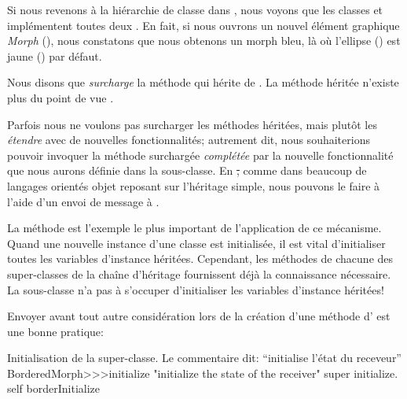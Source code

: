 \documentclass[a4paper,10pt,twoside]{book}
\begin{document}
Si nous revenons à la hiérarchie de classe  dans , nous voyons que les classes  et \mbox{} implémentent toutes deux .
En fait, si nous ouvrons un nouvel élément graphique \emph{Morph} (), nous constatons que nous obtenons un morph bleu, là où l'ellipse () est jaune \mbox{()} par défaut.

Nous disons que  \emph{surcharge} la méthode  qui hérite de .
La méthode héritée n'existe plus du point de vue .

Parfois nous ne voulons pas surcharger les méthodes héritées, mais plutôt les \emph{étendre} avec de nouvelles fonctionnalités; autrement dit, nous souhaiterions pouvoir invoquer la méthode surchargée \emph{complétée} par la nouvelle fonctionnalité que nous aurons définie dans la sous-classe.
En \st, comme dans beaucoup de langages orientés objet reposant sur l'héritage simple, nous pouvons le faire à l'aide d'un envoi de message à \super.

La méthode  est l'exemple le plus important de l'application de ce mécanisme.
Quand une nouvelle instance d'une classe est initialisée, il est vital
d'initialiser toutes les variables d'instance héritées.
Cependant, les méthodes  de chacune des super-classes
de la chaîne d'héritage fournissent déjà la connaissance nécessaire. 
La sous-classe n'a pas à s'occuper d'initialiser les variables d'instance héritées!

Envoyer  avant tout autre considération lors de la création d'une méthode d' est une bonne pratique:
\arevoir{}%

\begin{method}[morphinit]{Initialisation de la super-classe. Le commentaire dit: ``initialise l'état du receveur''}
BorderedMorph>>>initialize
	"initialize the state of the receiver"
	super initialize.
	self borderInitialize
\end{method}


\end{document}
